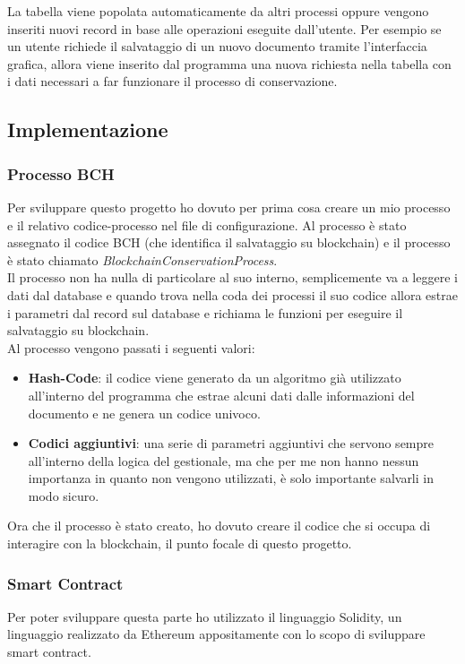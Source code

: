 La tabella viene popolata automaticamente da altri processi oppure vengono
inseriti nuovi record in base alle operazioni eseguite dall'utente. Per esempio
se un utente richiede il salvataggio di un nuovo documento tramite
l'interfaccia grafica, allora viene inserito dal programma una nuova richiesta
nella tabella con i dati necessari a far funzionare il processo di
conservazione.

\subsection{Implementazione}
\subsubsection{Processo BCH}
Per sviluppare questo progetto ho dovuto per prima cosa creare un mio processo
e il relativo codice-processo nel file di configurazione. Al processo è stato
assegnato il codice BCH (che identifica il salvataggio su blockchain) e il
processo è stato chiamato \textit{BlockchainConservationProcess}. \\
Il processo non ha nulla di particolare al suo interno, semplicemente va a 
leggere i dati dal database e quando trova nella coda dei processi il suo codice
allora estrae i parametri dal record sul database e richiama le funzioni per 
eseguire il salvataggio su blockchain. \\
Al processo vengono passati i seguenti valori:
\begin{itemize}
    \item \textbf{Hash-Code}: il codice viene generato da un algoritmo già 
        utilizzato all'interno del programma che estrae alcuni dati dalle 
        informazioni del documento e ne genera un codice univoco.
    \item \textbf{Codici aggiuntivi}: una serie di parametri aggiuntivi che
        servono sempre all'interno della logica del gestionale, ma che per me
        non hanno nessun importanza in quanto non vengono utilizzati, è solo
        importante salvarli in modo sicuro.
\end{itemize}

Ora che il processo è stato creato, ho dovuto creare il codice che si occupa
di interagire con la blockchain, il punto focale di questo progetto. 

\subsubsection{Smart Contract}
Per poter sviluppare questa parte ho utilizzato il linguaggio Solidity,
un linguaggio realizzato da Ethereum appositamente con lo scopo di sviluppare
smart contract.

